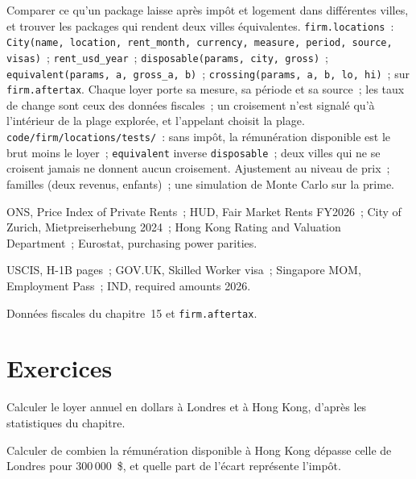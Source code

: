\begin{build}
 Comparer ce qu'un package laisse après impôt et logement dans différentes villes, et trouver les packages qui rendent
deux villes équivalentes.
 \texttt{firm.locations}~:
\texttt{City(name, location, rent\_month, currency, measure, period, source, visas)}~; \texttt{rent\_usd\_year}~; \texttt{disposable(params, city, gross)}~; \texttt{equivalent(params, a, gross\_a, b)}~;
\texttt{crossing(params, a, b, lo, hi)}~; sur \texttt{firm.aftertax}.
 Chaque loyer porte sa mesure, sa période et sa source~; les taux de change sont ceux des données fiscales~; un croisement
n'est signalé qu'à l'intérieur de la plage explorée, et l'appelant choisit la plage.
 \texttt{code/firm/locations/tests/}~: sans impôt, la rémunération disponible est le brut moins le loyer~;
\texttt{equivalent} inverse \texttt{disposable}~; deux villes qui ne se croisent jamais ne donnent aucun croisement.
 Ajustement au niveau de prix~; familles (deux revenus, enfants)~; une simulation de Monte Carlo sur la prime.
\end{build}

\begin{omsources}
\item ONS, Price Index of Private Rents~; HUD, Fair Market Rents FY2026~; City of Zurich, Mietpreiserhebung 2024~; Hong Kong
Rating and Valuation Department~; Eurostat, purchasing power parities.
\item USCIS, H-1B pages~; GOV.UK, Skilled Worker visa~; Singapore MOM, Employment Pass~; IND, required amounts 2026.
\item Données fiscales du chapitre~15 et \texttt{firm.aftertax}.
\end{omsources}

\section{Exercices}

\begin{exercise}[$\star$]\label{exo:in:locations:1}
Calculer le loyer annuel en dollars à Londres et à Hong Kong, d'après les statistiques du chapitre.
\end{exercise}

\begin{exercise}[$\star$]\label{exo:in:locations:2}
Calculer de combien la rémunération disponible à Hong Kong dépasse celle de Londres pour 300\,000~\$, et quelle part de l'écart représente l'impôt.
\end{exercise}

